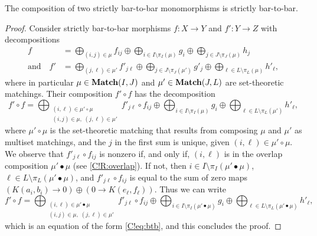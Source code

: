 \begin{proposition}
  The composition of two strictly bar-to-bar monomorphisms is strictly bar-to-bar.
\end{proposition}

\begin{proof}
  Consider strictly bar-to-bar morphisms $f \colon X \to Y$ and $f' \colon Y \to Z$ with decompositions
  \begin{align*}
    f & = \bigoplus_{(i, j) \in \mu} f_{ij} \oplus \bigoplus_{i \in I \setminus \pi_I(\mu)} g_i \oplus \bigoplus_{j \in J \setminus \pi_J(\mu)} h_j \\
    \text{and} \quad
    f' & = \bigoplus_{(j, \ell) \in \mu'} f'_{j\ell} \oplus \bigoplus_{j \in J \setminus \pi_J(\mu')} g'_j \oplus \bigoplus_{\ell \in L \setminus \pi_L(\mu)} h'_\ell,
  \end{align*}
  where in particular $\mu \in \operatorname{\mathbf{Match}}(I, J)$ and $\mu' \in \operatorname{\mathbf{Match}}(J, L)$ are set-theoretic matchings. Their composition $f' \circ f$ has the decomposition
  \[
    f' \circ f = \bigoplus_{\substack{(i, \ell) \in \mu' \circ \mu \\ (i, j) \in \mu, \; (j, \ell) \in \mu'}} f'_{j\ell} \circ f_{ij} \oplus \bigoplus_{i \in I \setminus \pi_I(\mu)} g_i \oplus \bigoplus_{\ell \in L \setminus \pi_L(\mu')} h'_{\ell},
  \]
  where $\mu' \circ \mu$ is the set-theoretic matching that results from composing $\mu$ and $\mu'$ as multiset matchings, and the $j$ in the first sum is unique, given $(i, \ell) \in \mu' \circ \mu$. We observe that $f'_{j\ell} \circ f_{ij}$ is nonzero if, and only if, $(i, \ell)$ is in the overlap composition $\mu' \bullet \mu$ (see \cref{C!R:overlap}). If not, then $i \in I \setminus \pi_I(\mu' \bullet \mu)$, $\ell \in L \setminus \pi_L(\mu' \bullet \mu)$, and $f'_{j\ell} \circ f_{ij}$ is equal to the sum of zero maps $(K(a_i, b_i) \to 0) \oplus (0 \to K(e_\ell, f_\ell))$. Thus we can write
  \[
    f' \circ f = \bigoplus_{\substack{(i, \ell) \in \mu' \bullet \mu \\ (i, j) \in \mu, \; (j, \ell) \in \mu'}} f'_{j\ell} \circ f_{ij} \oplus \bigoplus_{i \in I \setminus \pi_I(\mu' \bullet \mu)} g_i \oplus \bigoplus_{\ell \in L \setminus \pi_L(\mu' \bullet \mu)} h'_{\ell},
  \]
  which is an equation of the form \eqref{C!eq:btb}, and this concludes the proof.
\end{proof}


